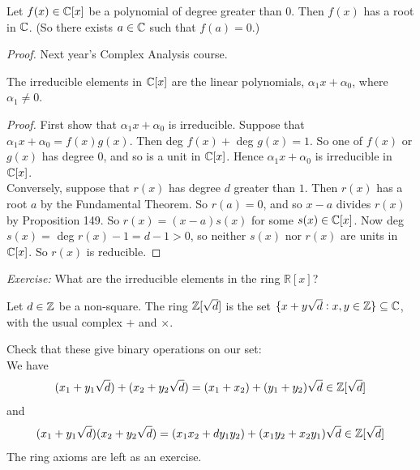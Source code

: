 \documentclass[10pt]{scrartcl}
\begin{document}
\begin{theorem}  Let $f(x)\in \mathbb{C}[x]$ be a polynomial of degree greater than 0. Then $f(x)$ has a root in $\mathbb{C}$. (So there exists $a \in \mathbb{C}$ such that $f(a) = 0$.)	
\end{theorem}\vspace*{5pt}

 \textit{Proof. }
Next year's Complex Analysis course.	\\

\begin{corollary}The irreducible elements in $\mathbb{C}[x]$ are the linear polynomials, $\alpha_1x + \alpha_0$, where $\alpha_1 \neq 0$.	
\end{corollary}

\begin{proof}
First show that $\alpha_1x + \alpha_0$ is irreducible. Suppose that $\alpha_1x + \alpha_0 = f(x)g(x)$. Then deg $f(x) +$ deg $g(x) = 1$. So one of $f(x)$ or $g(x)$ has degree $0$, and so is a unit in $\mathbb{C}[x]$. Hence $\alpha_1x + \alpha_0$ is irreducible in $\mathbb{C}[x]$.\\

Conversely, suppose that $r(x)$ has degree $d$ greater than $1$. Then $r(x)$ has a root $a$ by the Fundamental Theorem. So $r(a) = 0$, and so $x-a$ divides $r(x)$ by Proposition 149. So $r(x) = (x-a)s(x)$ for some $s(x) \in \mathbb{C}[x]$. Now deg $s(x) = $ deg $r(x) -1 = d-1 > 0$, so neither $s(x)$ nor $r(x)$ are units in $\mathbb{C}[x]$. So $r(x)$ is reducible. 
\end{proof}\vspace*{5pt}

 \textit{Exercise:} What are the irreducible elements in the ring $\mathbb{R}[x]$?
 \pagebreak

\vspace*{5pt}

\begin{definition} Let $d \in \mathbb{Z}$ be a non-square. The ring $\mathbb{Z}[\sqrt{d}]$ is the set $\{x + y\sqrt{d} : x,y \in \mathbb{Z}\} \subseteq \mathbb{C}$, with the usual complex $+$ and $\times$.	
\end{definition}\vspace*{5pt}

Check that these give binary operations on our set:\vspace*{3pt}\\ We have \[(x_1 + y_1\sqrt{d}) + (x_2 + y_2\sqrt{d}) = (x_1 + x_2) + (y_1 + y_2)\sqrt{d} \in \mathbb{Z}[\sqrt{d}]\]
and \[(x_1 + y_1\sqrt{d})(x_2 + y_2\sqrt{d}) = (x_1x_2 + dy_1y_2) + (x_1y_2 + x_2y_1)\sqrt{d} \in \mathbb{Z}[\sqrt{d}]\]
 The ring axioms are left as an exercise.\\
\end{document}
